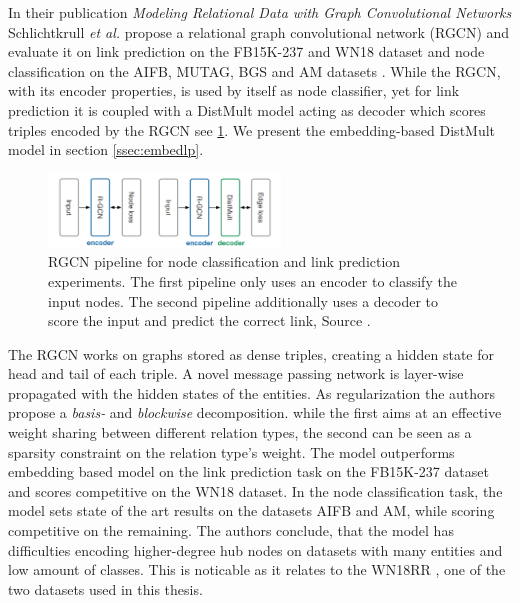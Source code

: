 

In their publication \textit{Modeling Relational Data with Graph Convolutional Networks} Schlichtkrull \textit{et al.} propose a relational graph convolutional network (RGCN) and evaluate it on link prediction on the FB15K-237 and WN18 dataset and node classification on the AIFB, MUTAG, BGS and AM datasets \cite{gangemi_modeling_2018}. While the RGCN, with its encoder properties, is used by itself as node classifier, yet for link prediction it is coupled with a DistMult model acting as decoder which scores triples encoded by the RGCN see \ref{fig:RGCN}. We present the embedding-based DistMult model in section \ref{ssec:embedlp}.

\begin{figure}[h]
    \centering
    \includegraphics[width=0.55\textwidth]{data/images/RGCN.png}
    \caption{RGCN pipeline for node classification and link prediction experiments. The first pipeline only uses an encoder to classify the input nodes. The second pipeline additionally uses a decoder to score the input and predict the correct link, Source \cite{gangemi_modeling_2018}.}
    \label{fig:RGCN}
\end{figure}

The RGCN works on graphs stored as dense triples, creating a hidden state for head and tail of each triple. A novel message passing network is layer-wise propagated with the hidden states of the entities. As regularization the authors propose a \textit{basis-} and \textit{blockwise} decomposition. while the first  aims at an effective weight sharing between different relation types, the second  can be seen as a sparsity constraint on the relation type's weight. The model outperforms embedding based model on the link prediction task on the FB15K-237 dataset and scores competitive on the WN18 dataset. In the node classification task, the model sets state of the art results on the datasets AIFB and AM, while scoring competitive on the remaining. The authors conclude, that the model has difficulties encoding higher-degree hub nodes on datasets with many entities and low amount of classes. This is noticable as it relates to the WN18RR \cite{battaglia_relational_2018}, one of the two datasets used in this thesis.  


